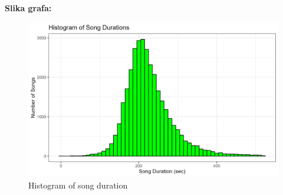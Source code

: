     \textbf{Slika grafa:}
    \begin{figure}[H]
        \includegraphics[scale=0.9]{slike/Histogram of song durations.png}
        \centering
        \caption{Histogram of song duration}
        
    \end{figure}


\eject



